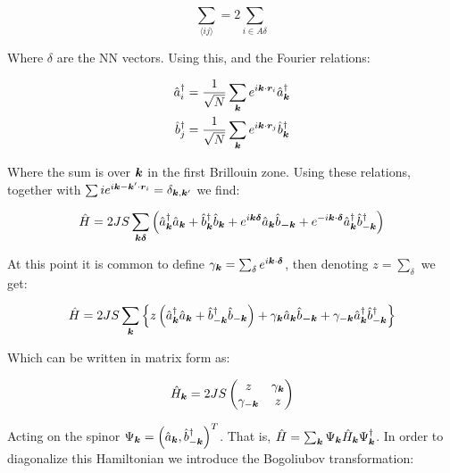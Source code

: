 \begin{equation}
\sum_{\langle i j \rangle} = 2\sum_{i \in A \delta}
\end{equation}

Where $\delta$ are the NN vectors. Using this, and the Fourier relations:

\begin{align}
\hat{a}_i^\dagger &= \frac{1}{\sqrt{N}} \sum_{\boldsymbol{k}} e^{i \boldsymbol{k} \cdot \boldsymbol{r}_i} \hat{a}_{\boldsymbol{k}}^\dagger \\
\hat{b}_j^\dagger &= \frac{1}{\sqrt{N}} \sum_{\boldsymbol{k}} e^{i \boldsymbol{k} \cdot \boldsymbol{r}_j} \hat{b}_{\boldsymbol{k}}^\dagger
\end{align}

Where the sum is over $\boldsymbol{k}$ in the first Brillouin zone. Using these relations, together with $\sum{i} e^{i{\boldsymbol{k}-\boldsymbol{k}'}\cdot\boldsymbol{r}_i} = \delta_{\boldsymbol{k}, \boldsymbol{k}'}$ we find:

\begin{equation}
\hat{H} = 2JS \sum_{\boldsymbol{k} \boldsymbol{\delta}} \left( \hat{a}^\dagger_{\boldsymbol{k}}\hat{a}_{\boldsymbol{k}} + \hat{b}^\dagger_{\boldsymbol{k}}\hat{b}_{\boldsymbol{k}} + e^{i\boldsymbol{k}\boldsymbol{\delta}}\hat{a}_{\boldsymbol{k}}\hat{b}_{\boldsymbol{-k}} + e^{-i \boldsymbol{k}\cdot\boldsymbol{\delta}}  \hat{a}^\dagger_{\boldsymbol{k}}\hat{b}^\dagger_{-\boldsymbol{k}} \right)
\end{equation}

At this point it is common to define $\gamma_{\boldsymbol{k}} = \sum_\delta e^{i \boldsymbol{k} \cdot \boldsymbol{\delta}}$, then denoting $z = \sum_\delta$ we get:

\begin{equation}
\label{MagnonicH}
\hat{H} = 2JS \sum_{\boldsymbol{k}} \left\{ z \left( \hat{a}^\dagger_{\boldsymbol{k}}\hat{a}_{\boldsymbol{k}} + \hat{b}^\dagger_{-\boldsymbol{k}}\hat{b}_{-\boldsymbol{k}} \right) + \gamma_{\boldsymbol{k}}\hat{a}_{\boldsymbol{k}}\hat{b}_{\boldsymbol{-k}} + \gamma_{-\boldsymbol{k}}\hat{a}^\dagger_{\boldsymbol{k}}\hat{b}^\dagger_{-\boldsymbol{k}} \right\}
\end{equation}

Which can be written in matrix form as:

\begin{equation}
\hat{H}_{\boldsymbol{k}} = 2JS\begin{pmatrix} 
z & \gamma_{\boldsymbol{k}} \\
\gamma_{-\boldsymbol{k}} & z
\end{pmatrix}
\end{equation}

Acting on the spinor $\Psi_{\boldsymbol{k}} = \left(\hat{a}_{\boldsymbol{k}},\hat{b}_{-\boldsymbol{k}}^\dagger \right)^T$. That is, $\hat{H} = \sum_{\boldsymbol{k}} \Psi_{\boldsymbol{k}} \hat{H}_{\boldsymbol{k}} \Psi^\dagger_{\boldsymbol{k}}$. In order to diagonalize this Hamiltonian we introduce the Bogoliubov transformation:


